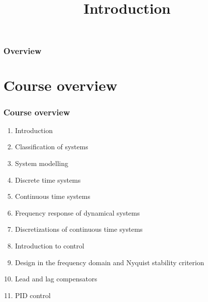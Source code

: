 \documentclass{beamer}
\title{Introduction}
\author{}
\begin{document}
\begin{frame}
\titlepage
\end{frame}

\begin{frame}
\frametitle{Overview} 
\tableofcontents
\end{frame}


\section{Course overview} 

\begin{frame}
\frametitle{Course overview}
\begin{enumerate}
\item Introduction
\item Classification of systems
\item System modelling
\item Discrete time systems
\item Continuous time systems
\item Frequency response of dynamical systems
\item Discretizations of continuous time systems
\item Introduction to control
\item Design in the frequency domain and Nyquist stability criterion
\item Lead and lag compensators
\item PID control
\end{enumerate}
\end{frame}

\end{document}
